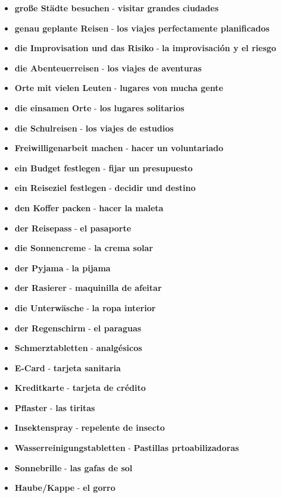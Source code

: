 \documentclass{article}
\begin{document}
\begin{multicols}{2}
\begin{itemize}
		\item{\textbf{große Städte besuchen} - \textbf{visitar grandes ciudades}}
		\item{\textbf{genau geplante Reisen} - \textbf{los viajes perfectamente planificados}}
		\item{\textbf{die Improvisation und das Risiko} - \textbf{la improvisación y el riesgo}}
		\item{\textbf{die Abenteuerreisen} - \textbf{los viajes de aventuras}}
		\item{\textbf{Orte mit vielen Leuten} - \textbf{lugares von mucha gente}}
		\item{\textbf{die einsamen Orte} - \textbf{los lugares solitarios}}
		\item{\textbf{die Schulreisen} - \textbf{los viajes de estudios}}
		\item{\textbf{Freiwilligenarbeit machen} - \textbf{hacer un voluntariado}}
		\item{\textbf{ein Budget festlegen} - \textbf{fijar un presupuesto}}
		\item{\textbf{ein Reiseziel festlegen} - \textbf{decidir und destino}}
		\item{\textbf{den Koffer packen} - \textbf{hacer la maleta}}
		\item{\textbf{der Reisepass} - \textbf{el pasaporte}}
		\item{\textbf{die Sonnencreme} - \textbf{la crema solar}}
		\item{\textbf{der Pyjama} - \textbf{la pijama}}
		\item{\textbf{der Rasierer} - \textbf{maquinilla de afeitar}}
		\item{\textbf{die Unterwäsche} - \textbf{la ropa interior}}
		\item{\textbf{der Regenschirm} - \textbf{el paraguas}}
		\item{\textbf{Schmerztabletten} - \textbf{analgésicos}}
		\item{\textbf{E-Card} - \textbf{tarjeta sanitaria}}
		\item{\textbf{Kreditkarte} - \textbf{tarjeta de crédito}}
		\item{\textbf{Pflaster} - \textbf{las tiritas}}
		\item{\textbf{Insektenspray} - \textbf{repelente de insecto}}
		\item{\textbf{Wasserreinigungstabletten} - \textbf{Pastillas prtoabilizadoras}}
		\item{\textbf{Sonnebrille} - \textbf{las gafas de sol}}
		\item{\textbf{Haube/Kappe} - \textbf{el gorro}}

\end{itemize}
\end{multicols}
\end{document}
